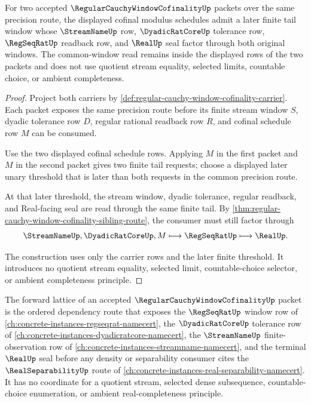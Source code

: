 \begin{theorem}
\label{thm:regular-cauchy-window-cofinality-tail-directedness}
For two accepted $\RegularCauchyWindowCofinalityUp$ packets over the same precision route, the displayed cofinal modulus schedules admit a later finite tail window whose $\StreamNameUp$ row, $\DyadicRatCoreUp$ tolerance row, $\RegSeqRatUp$ readback row, and $\RealUp$ seal factor through both original windows. The common-window read remains inside the displayed rows of the two packets and does not use quotient stream equality, selected limits, countable choice, or ambient completeness.
\end{theorem}
\begin{proof}
Project both carriers by \autoref{def:regular-cauchy-window-cofinality-carrier}. Each packet exposes the same precision route before its finite stream window $S$, dyadic tolerance row $D$, regular rational readback row $R$, and cofinal schedule row $M$ can be consumed.

Use the two displayed cofinal schedule rows. Applying $M$ in the first packet and $M$ in the second packet gives two finite tail requests; choose a displayed later unary threshold that is later than both requests in the common precision route.

At that later threshold, the stream window, dyadic tolerance, regular readback, and Real-facing seal are read through the same finite tail. By \autoref{thm:regular-cauchy-window-cofinality-sibling-route}, the consumer must still factor through
$$
\StreamNameUp,\DyadicRatCoreUp,M \longmapsto \RegSeqRatUp \longmapsto \RealUp .
$$

The construction uses only the carrier rows and the later finite threshold. It introduces no quotient stream equality, selected limit, countable-choice selector, or ambient completeness principle.
\end{proof}

\begin{definition}
\label{def:regular-cauchy-window-cofinality-forward-lattice}
The forward lattice of an accepted $\RegularCauchyWindowCofinalityUp$ packet is the ordered dependency route that exposes the $\RegSeqRatUp$ window row of \autoref{ch:concrete-instances-regseqrat-namecert}, the $\DyadicRatCoreUp$ tolerance row of \autoref{ch:concrete-instances-dyadicratcore-namecert}, the $\StreamNameUp$ finite-observation row of \autoref{ch:concrete-instances-streamname-namecert}, and the terminal $\RealUp$ seal before any density or separability consumer cites the $\RealSeparabilityUp$ route of \autoref{ch:concrete-instances-real-separability-namecert}. It has no coordinate for a quotient stream, selected dense subsequence, countable-choice enumeration, or ambient real-completeness principle.
\end{definition}

